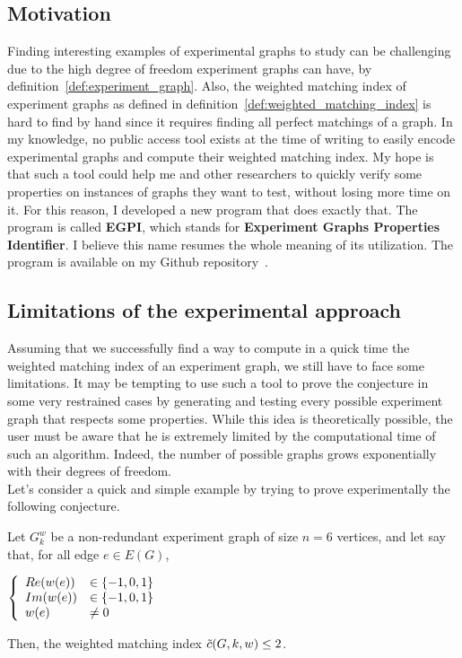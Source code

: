 \subsection{Motivation}
\label{subsec:computational_motivations}

Finding interesting examples of experimental graphs to study can be challenging due to the high degree of freedom experiment graphs can have, by definition~\ref{def:experiment_graph}.
Also, the weighted matching index of experiment graphs as defined in definition~\ref{def:weighted_matching_index} is hard to find by hand since it requires finding all perfect matchings of a graph.
In my knowledge, no public access tool exists at the time of writing to easily encode experimental graphs and compute their weighted matching index.
My hope is that such a tool could help me and other researchers to quickly verify some properties on instances of graphs they want to test, without losing more time on it.
For this reason, I developed a new program that does exactly that.
The program is called \textbf{EGPI}, which stands for \textbf{Experiment Graphs Properties Identifier}.
I believe this name resumes the whole meaning of its utilization.
The program is available on my Github repository~\cite{githubEGPI}.


\subsection{Limitations of the experimental approach}
\label{subsec:EGPI_limitations}

Assuming that we successfully find a way to compute in a quick time the weighted matching index of an experiment graph, we still have to face some limitations.
It may be tempting to use such a tool to prove the conjecture in some very restrained cases by generating and testing every possible experiment graph that respects some properties.
While this idea is theoretically possible, the user must be aware that he is extremely limited by the computational time of such an algorithm.
Indeed, the number of possible graphs grows exponentially with their degrees of freedom.\\

Let's consider a quick and simple example by trying to prove experimentally the following conjecture.

\begin{conjecture}
    \label{con:krenn_6}
    Let $G_k^w$ be a non-redundant experiment graph of size $n = 6$ vertices, and let say that, for all edge $e \in E(G)$,
    \begin{center}
        $\left\{\begin{array}{l l}
            Re(w(e)) & \in \{-1, 0, 1\} \\
            Im(w(e)) & \in \{-1, 0, 1\} \\
            w(e)     & \neq 0          \\
        \end{array}\right.$
    \end{center}
    Then, the weighted matching index $\Tilde{c}(G, k, w) \leq 2$.
\end{conjecture}

